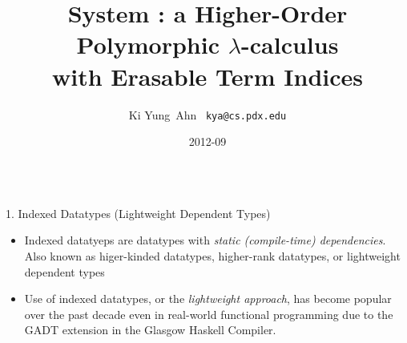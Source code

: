 \documentclass[final]{beamer}
\title[Fancy Posters]{{\VERYHuge System \Fi} {\Huge :}
		{\huge a Higher-Order Polymorphic $\lambda$-calculus} \\
		{\huge with Erasable Term Indices}
  }
\author[Ki Yung Ahn]{ Ki Yung $\,$Ahn $\,$ {\Large\texttt{kya@cs.pdx.edu}} }
\institute[Portland State University]{
	Department of Computer Science, Portland State University }
\date{2012-09}
\begin{document}
\begin{frame}[fragile]
\begin{columns}[t]

\begin{column}{.315\linewidth}

\begin{block}{1. Indexed Datatypes
	{\normalsize(Lightweight Dependent Types)} }
\begin{itemize}
\item Indexed datatyeps are datatypes
	with \emph{static (compile-time) dependencies}.
	Also known as higer-kinded datatypes, higher-rank datatypes,
	or lightweight dependent types
\item Use of indexed datatypes, or the {\emph{lightweight approach}},
	has become popular
	over the past decade even in real-world functional programming due to
	the GADT extension in the Glasgow Haskell Compiler.
\end{itemize}
\end{block}


\end{column}
\end{columns}
\end{frame}
\end{document}
